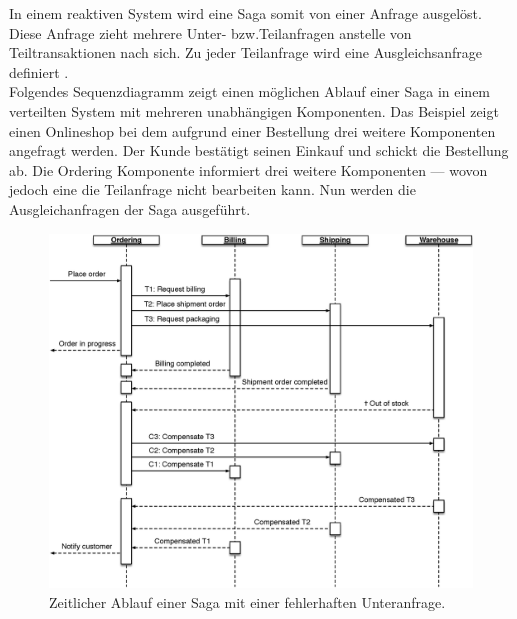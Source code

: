 In einem reaktiven System wird eine Saga somit von einer Anfrage ausgelöst. Diese Anfrage zieht mehrere Unter- bzw.Teilanfragen anstelle von Teiltransaktionen nach sich. Zu jeder Teilanfrage wird eine Ausgleichsanfrage definiert \cite{mccaffrey_goto_2015}.\\
Folgendes Sequenzdiagramm zeigt einen möglichen Ablauf einer Saga in einem verteilten System mit mehreren unabhängigen Komponenten. Das Beispiel zeigt einen Onlineshop bei dem aufgrund einer Bestellung drei weitere Komponenten angefragt werden. Der Kunde bestätigt seinen Einkauf und schickt die Bestellung ab. Die Ordering Komponente informiert drei weitere Komponenten --- wovon jedoch eine die Teilanfrage nicht bearbeiten kann. Nun werden die Ausgleichanfragen der Saga ausgeführt.

\begin{figure}[H]
 \centering
 \includegraphics[width=1\textwidth]{4-Hauptteil/saga/onlineshop-saga.eps}
 \caption{Zeitlicher Ablauf einer Saga mit einer fehlerhaften Unteranfrage.}
 \label{fig:sequence-saga}
\end{figure}

\pagebreak

